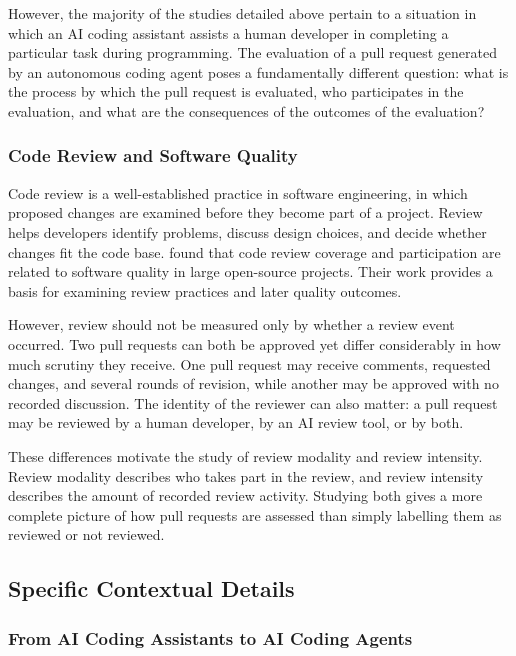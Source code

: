 \documentclass[stu,12pt,donotrepeattitle]{apa7}
\begin{document}
However, the majority of the studies detailed above pertain to a situation in which an AI coding assistant assists a human developer in completing a particular task during programming. The evaluation of a pull request generated by an autonomous coding agent poses a fundamentally different question: what is the process by which the pull request is evaluated, who participates in the evaluation, and what are the consequences of the outcomes of the evaluation?

\subsubsection{Code Review and Software Quality}

Code review is a well-established practice in software engineering, in which proposed changes are examined before they become part of a project. Review helps developers identify problems, discuss design choices, and decide whether changes fit the code base. \textcite{mcintosh2014,mcintosh2016} found that code review coverage and participation are related to software quality in large open-source projects. Their work provides a basis for examining review practices and later quality outcomes.

However, review should not be measured only by whether a review event occurred. Two pull requests can both be approved yet differ considerably in how much scrutiny they receive. One pull request may receive comments, requested changes, and several rounds of revision, while another may be approved with no recorded discussion. The identity of the reviewer can also matter: a pull request may be reviewed by a human developer, by an AI review tool, or by both.

These differences motivate the study of review modality and review intensity. Review modality describes who takes part in the review, and review intensity describes the amount of recorded review activity. Studying both gives a more complete picture of how pull requests are assessed than simply labelling them as reviewed or not reviewed.

\subsection{Specific Contextual Details}

\subsubsection{From AI Coding Assistants to AI Coding Agents}
\end{document}
